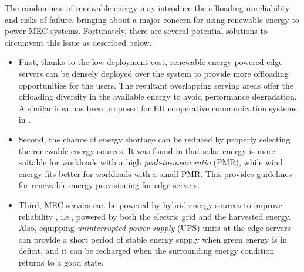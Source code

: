 \documentclass[journal]{IEEEtran}
\begin{document}
{The randomness of renewable energy may introduce the offloading unreliability and risks of failure, bringing about a major concern for using renewable energy to power MEC systems. Fortunately, there are several potential solutions to circumvent this issue as described below.

\begin{itemize}
\item First, thanks to the low deployment cost, renewable energy-powered edge servers can be densely deployed over the system to provide more offloading opportunities for the users.  The resultant overlapping serving areas offer the offloading diversity in the available energy to avoid performance degradation. A similar idea has been proposed for EH cooperative communication systems in \cite{YLuoTCOM1603}.

\item {Second, the chance of energy shortage can be reduced by properly selecting the renewable energy sources. It was found in \cite{MLin1206} that solar energy is more suitable for workloads with a high \emph{peak-to-mean ratio} (PMR), while wind energy fits better for workloads with a small PMR. This provides guidelines for renewable energy provisioning for edge servers.}

\item Third, MEC servers can be powered by hybrid energy sources to improve reliability \cite{JGongTCOM13,THanTWC1309,YMaoTWC16}, i.e., powered by both the electric grid and the harvested energy. Also, equipping \emph{uninterrupted power supply} (UPS) units at the edge servers can provide a short period of stable energy supply when green energy is in deficit, and it can be recharged when the surrounding energy condition returns to a good state.


\end{itemize}}
\end{document}
